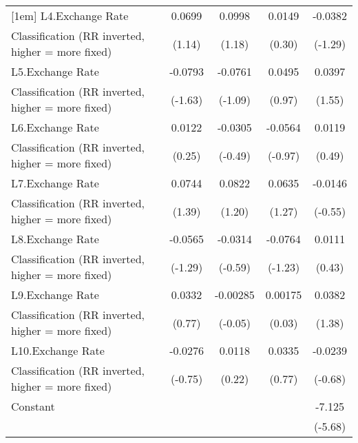 {\begin{tabular}{l*{4}{c}}
[1em]
L4.Exchange Rate    &      0.0699         &      0.0998         &      0.0149         &     -0.0382         \\
Classification (RR inverted, higher = more fixed)&      (1.14)         &      (1.18)         &      (0.30)         &     (-1.29)         \\
[1em]
L5.Exchange Rate    &     -0.0793         &     -0.0761         &      0.0495         &      0.0397         \\
Classification (RR inverted, higher = more fixed)&     (-1.63)         &     (-1.09)         &      (0.97)         &      (1.55)         \\
[1em]
L6.Exchange Rate    &      0.0122         &     -0.0305         &     -0.0564         &      0.0119         \\
Classification (RR inverted, higher = more fixed)&      (0.25)         &     (-0.49)         &     (-0.97)         &      (0.49)         \\
[1em]
L7.Exchange Rate    &      0.0744         &      0.0822         &      0.0635         &     -0.0146         \\
Classification (RR inverted, higher = more fixed)&      (1.39)         &      (1.20)         &      (1.27)         &     (-0.55)         \\
[1em]
L8.Exchange Rate    &     -0.0565         &     -0.0314         &     -0.0764         &      0.0111         \\
Classification (RR inverted, higher = more fixed)&     (-1.29)         &     (-0.59)         &     (-1.23)         &      (0.43)         \\
[1em]
L9.Exchange Rate    &      0.0332         &    -0.00285         &     0.00175         &      0.0382         \\
Classification (RR inverted, higher = more fixed)&      (0.77)         &     (-0.05)         &      (0.03)         &      (1.38)         \\
[1em]
L10.Exchange Rate   &     -0.0276         &      0.0118         &      0.0335         &     -0.0239         \\
Classification (RR inverted, higher = more fixed)&     (-0.75)         &      (0.22)         &      (0.77)         &     (-0.68)         \\
[1em]
Constant            &                     &                     &                     &      -7.125\sym{***}\\
                    &                     &                     &                     &     (-5.68)         \\

\end{tabular}}
